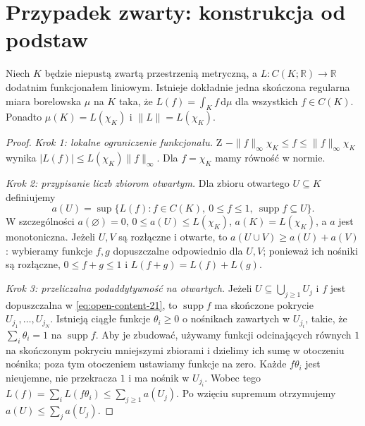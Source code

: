 \section{Przypadek zwarty: konstrukcja od podstaw}
\begin{twierdzenie}
\label{thm:compact-riesz-21}
Niech $K$ będzie niepustą zwartą przestrzenią metryczną,
a $L:C(K;\mathbb R)\to\mathbb R$ dodatnim funkcjonałem
liniowym. Istnieje dokładnie jedna skończona regularna
miara borelowska $\mu$ na $K$ taka, że
$L(f)=\int_Kf\,\mathrm d\mu$ dla wszystkich $f\in C(K)$.
Ponadto $\mu(K)=L(\chi_K)$ i
$\|L\|=L(\chi_K)$.
\end{twierdzenie}
\begin{proof}
\emph{Krok 1: lokalne ograniczenie funkcjonału.}
Z $-\|f\|_\infty\chi_K\le f\le\|f\|_\infty\chi_K$
wynika $|L(f)|\le L(\chi_K)\|f\|_\infty$.
Dla $f=\chi_K$ mamy równość w normie.

\emph{Krok 2: przypisanie liczb zbiorom otwartym.}
Dla zbioru otwartego $U\subseteq K$ definiujemy
\begin{equation}\label{eq:open-content-21}
 a(U)=\sup\{L(f): f\in C(K),\ 0\le f\le1,\
          \operatorname{supp}f\subseteq U\}.
\end{equation}
W szczególności $a(\varnothing)=0$,
$0\le a(U)\le L(\chi_K)$, $a(K)=L(\chi_K)$,
a $a$ jest monotoniczna. Jeżeli $U,V$ są rozłączne
i otwarte, to $a(U\cup V)\ge a(U)+a(V)$:
wybieramy funkcje $f,g$ dopuszczalne odpowiednio dla
$U,V$; ponieważ ich nośniki są rozłączne,
$0\le f+g\le1$ i $L(f+g)=L(f)+L(g)$.

\emph{Krok 3: przeliczalna podaddytywność na otwartych.}
Jeżeli $U\subseteq\bigcup_{j\ge1}U_j$ i $f$ jest
dopuszczalna w \eqref{eq:open-content-21}, to
$\operatorname{supp}f$ ma skończone pokrycie
$U_{j_1},\ldots,U_{j_N}$. Istnieją ciągłe funkcje
$\theta_i\ge0$ o nośnikach zawartych w $U_{j_i}$,
takie, że $\sum_i\theta_i=1$ na
$\operatorname{supp}f$. Aby je zbudować, używamy
funkcji odcinających równych $1$ na skończonym
pokryciu mniejszymi zbiorami i dzielimy ich sumę
w otoczeniu nośnika; poza tym otoczeniem ustawiamy
funkcje na zero. Każde $f\theta_i$ jest nieujemne,
nie przekracza $1$ i ma nośnik w $U_{j_i}$.
Wobec tego
$L(f)=\sum_i L(f\theta_i)\le\sum_{j\ge1}a(U_j)$.
Po wzięciu supremum otrzymujemy
$a(U)\le\sum_j a(U_j)$.


\end{proof}
